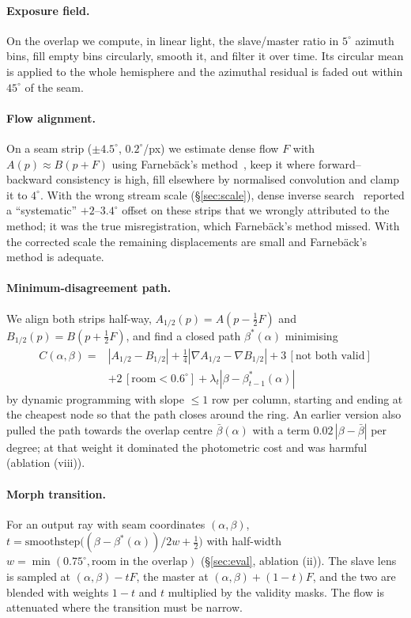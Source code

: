 \documentclass[11pt]{article}
\begin{document}
\paragraph{Exposure field.} On the overlap we compute, in linear light, the slave/master ratio in $5^\circ$ azimuth bins, fill empty bins circularly, smooth it, and filter it over time. Its circular mean is applied to the whole hemisphere and the azimuthal residual is faded out within $45^\circ$ of the seam.

\paragraph{Flow alignment.} On a seam strip ($\pm4.5^\circ$, $0.2^\circ$/px) we estimate dense flow $F$ with $A(p)\approx B(p+F)$ using Farneb\"ack's method~\cite{farneback2003}, keep it where forward--backward consistency is high, fill elsewhere by normalised convolution and clamp it to $4^\circ$. With the wrong stream scale (\S\ref{sec:scale}), dense inverse search~\cite{kroeger2016dis} reported a ``systematic'' $+2$--$3.4^\circ$ offset on these strips that we wrongly attributed to the method; it was the true misregistration, which Farneb\"ack's method missed. With the corrected scale the remaining displacements are small and Farneb\"ack's method is adequate.

\paragraph{Minimum-disagreement path.} We align both strips half-way, $A_{1/2}(p)=A(p-\tfrac12F)$ and $B_{1/2}(p)=B(p+\tfrac12F)$, and find a closed path $\beta^*(\alpha)$ minimising
\begin{equation}
\begin{aligned}
C(\alpha,\beta)={}&|A_{1/2}-B_{1/2}| + \tfrac14|\nabla A_{1/2}-\nabla B_{1/2}| + 3\,[\text{not both valid}]\\
&+ 2\,[\text{room}<0.6^\circ] + \lambda_t|\beta-\beta^*_{t-1}(\alpha)|
\end{aligned}
\end{equation}
by dynamic programming with slope $\le1$ row per column, starting and ending at the cheapest node so that the path closes around the ring. An earlier version also pulled the path towards the overlap centre $\bar\beta(\alpha)$ with a term $0.02\,|\beta-\bar\beta|$ per degree; at that weight it dominated the photometric cost and was harmful (ablation (viii)).

\paragraph{Morph transition.} For an output ray with seam coordinates $(\alpha,\beta)$, $t=\mathrm{smoothstep}\big((\beta-\beta^*(\alpha))/2w+\tfrac12\big)$ with half-width $w=\min(0.75^\circ,\text{room in the overlap})$ (\S\ref{sec:eval}, ablation (ii)). The slave lens is sampled at $(\alpha,\beta)-tF$, the master at $(\alpha,\beta)+(1-t)F$, and the two are blended with weights $1-t$ and $t$ multiplied by the validity masks. The flow is attenuated where the transition must be narrow.
\end{document}

